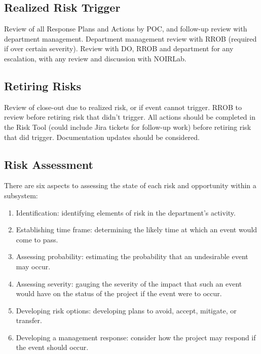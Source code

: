 \subsection{Realized Risk Trigger}

Review of all Response Plans and Actions by POC, and follow-up review with department management.
Department management review with RROB (required if over certain severity).
Review with DO, RROB and department for any escalation, with any review and discussion with NOIRLab.

\subsection{Retiring Risks}

Review of close-out due to realized risk, or if event cannot trigger.
RROB to review before retiring risk that didn't trigger.
All actions should be completed in the Risk Tool (could include Jira tickets for follow-up work) before retiring risk that did trigger.
Documentation updates should be considered.

\subsection{Risk Assessment}

There are six aspects to assessing the state of each risk and opportunity within a subsystem:
\begin{enumerate}
\item Identification:  identifying elements of risk in the department’s activity.
\item Establishing time frame:  determining the likely time at which an event would come to pass.
\item Assessing probability:  estimating the probability that an undesirable event may occur.
\item Assessing severity:  gauging the severity of the impact that such an event would have on the status of the project if the event were to occur.
\item Developing risk options:  developing plans to avoid, accept, mitigate, or transfer. 
\item Developing a management response: consider how the project may respond if the event should occur.
\end{enumerate}
